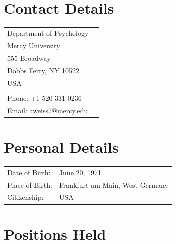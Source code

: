 \documentclass[11pt]{article}
\begin{document}

\noindent{\rule{\textwidth}{1pt}} \\

\section*{Contact Details}

\begin{tabular}{p{12cm}p{3cm}}
  Department of Psychology & \\
  Mercy University & \\
  555 Broadway & \\
  Dobbs Ferry, NY 10522 & \\
  USA & \\ \\

  Phone: +1 520 331 0236 & \\
  Email: aweiss7@mercy.edu &
\end{tabular}

\section*{Personal Details}

\begin{tabular}{p{3cm}p{12cm}}
  Date of Birth: & June 20, 1971 \\
  Place of Birth: & Frankfurt am Main, West Germany \\
  Citizenship: & USA
\end{tabular}

\section*{Positions Held}
\end{document}
